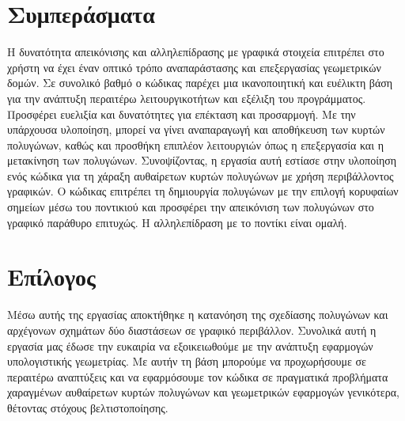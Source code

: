 \chapter*{Συμπεράσματα}
Η δυνατότητα απεικόνισης και αλληλεπίδρασης με γραφικά στοιχεία επιτρέπει στο χρήστη να έχει έναν οπτικό τρόπο αναπαράστασης και επεξεργασίας γεωμετρικών δομών. Σε συνολικό βαθμό ο κώδικας παρέχει μια ικανοποιητική και ευέλικτη βάση για την ανάπτυξη περαιτέρω λειτουργικοτήτων και εξέλιξη του προγράμματος. Προσφέρει ευελιξία και δυνατότητες για επέκταση και προσαρμογή. Με την υπάρχουσα υλοποίηση, μπορεί να γίνει αναπαραγωγή και αποθήκευση των κυρτών πολυγώνων, καθώς και προσθήκη επιπλέον λειτουργιών όπως η επεξεργασία και η μετακίνηση των πολυγώνων. Συνοψίζοντας, η εργασία αυτή εστίασε στην υλοποίηση ενός κώδικα για τη χάραξη αυθαίρετων κυρτών πολυγώνων με χρήση περιβάλλοντος γραφικών. Ο κώδικας επιτρέπει τη δημιουργία πολυγώνων με την επιλογή κορυφαίων σημείων μέσω του ποντικιού και προσφέρει την απεικόνιση των πολυγώνων στο γραφικό παράθυρο επιτυχώς. Η αλληλεπίδραση με το ποντίκι είναι ομαλή. 

\chapter*{Επίλογος}
Μέσω αυτής της εργασίας αποκτήθηκε η κατανόηση της σχεδίασης πολυγώνων και αρχέγονων σχημάτων δύο διαστάσεων σε γραφικό περιβάλλον. Συνολικά αυτή η εργασία μας έδωσε την ευκαιρία να εξοικειωθούμε με την ανάπτυξη εφαρμογών υπολογιστικής γεωμετρίας. Με αυτήν τη βάση μπορούμε να προχωρήσουμε σε περαιτέρω αναπτύξεις και να εφαρμόσουμε τον κώδικα σε πραγματικά προβλήματα χαραγμένων αυθαίρετων κυρτών πολυγώνων και γεωμετρικών εφαρμογών γενικότερα, θέτοντας στόχους βελτιστοποίησης. 

